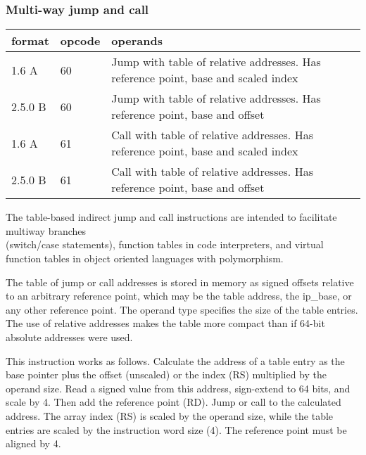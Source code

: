 \documentclass[forwardcom.tex]{subfiles}
\begin{document}
\subsubsection{Multi-way jump and call}
\label{table:multiwayJumpCallInstructions}
\begin{tabular}{|p{14mm}|p{12mm}|p{110mm}|}
\hline
\bfseries format & \bfseries opcode & \bfseries operands \\ \hline
1.6 A   & 60 & Jump with table of relative addresses. \linebreak Has reference point, base and scaled index  \\ \hline
2.5.0 B & 60 & Jump with table of relative addresses. \linebreak Has reference point, base and offset  \\ \hline
1.6 A   & 61 & Call with table of relative addresses. \linebreak Has reference point, base and scaled index    \\ \hline
2.5.0 B & 61 & Call with table of relative addresses. \linebreak Has reference point, base and offset \\ \hline
\end{tabular}
\vspace{2mm}

\label{jumpTableInstruction}
The table-based indirect jump and call instructions are intended to facilitate multiway branches \\
(switch/case statements), function tables in code interpreters, and virtual function tables in object oriented languages with polymorphism. 
\vspace{2mm}

The table of jump or call addresses is stored in memory as signed offsets relative to an arbitrary reference point, which may be the table address, the ip\_base, or any other reference point. The operand type specifies the size of the table entries. The use of relative addresses makes the table more compact than if 64-bit absolute addresses were used.
\vspace{2mm}

This instruction works as follows. Calculate the address of a table entry as the base pointer plus the offset (unscaled) or the index (RS) multiplied by the operand size. Read a signed value from this address, sign-extend to 64 bits, and scale by 4. Then add the reference point (RD). Jump or call to the calculated address. The array index (RS) is scaled by the operand size, while the table entries are scaled by the instruction word size (4). The reference point must be aligned by 4.
\vspace{2mm}
\end{document}
